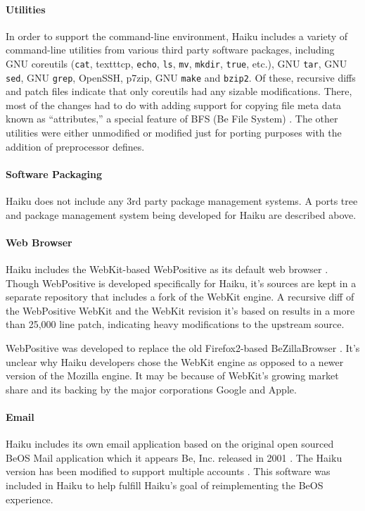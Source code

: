\documentclass{article}
\begin{document}
\paragraph{Utilities}
In order to support the command-line environment, Haiku includes a
variety of command-line utilities from various third party software
packages, including GNU coreutils (\texttt{cat},
texttt{cp}, \texttt{echo}, \texttt{ls}, \texttt{mv}, \texttt{mkdir},
\texttt{true}, etc.), GNU \texttt{tar}, GNU \texttt{sed}, GNU
\texttt{grep}, OpenSSH, p7zip, GNU \texttt{make} and \texttt{bzip2}.
Of these, recursive diffs and patch files \cite{HaikuR1A3Src} indicate
that only coreutils had any sizable modifications.  There, most of the
changes had to do with adding support for copying file meta data known
as ``attributes,'' a special feature of BFS (Be File System)
\cite{BFSWiki}.  The other utilities were either unmodified or
modified just for porting purposes with the addition of preprocessor
defines.

\paragraph{Software Packaging}
Haiku does not include any 3rd party package management systems.  A
ports tree and package management system being developed for Haiku are
described above.

\paragraph{Web Browser}
Haiku includes the WebKit-based WebPositive as its default web browser
\cite{WebPositiveWiki}.  Though WebPositive is developed specifically
for Haiku, it's sources are kept in a separate repository
\cite{WebPositiveTrac} that includes a fork of the WebKit engine.  A
recursive diff of the WebPositive WebKit and the WebKit revision it's
based on results in a more than 25,000 line patch, indicating heavy
modifications to the upstream source.

WebPositive was developed to replace the old Firefox2-based
BeZillaBrowser \cite{WebPositiveWiki}.  It's unclear why Haiku
developers chose the WebKit engine as opposed to a newer version of
the Mozilla engine.  It may be because of WebKit's growing market
share and its backing by the major corporations Google and Apple.

\paragraph{Email}
Haiku includes its own email application based on the original open
sourced BeOS Mail application \cite{BeMailOpenSourced} which it
appears Be, Inc. released in 2001 \cite{BeMailLICENSE}.  The Haiku
version has been modified to support multiple accounts
\cite{BeMailOpenSourced}.  This software was included in Haiku to help
fulfill Haiku's goal of reimplementing the BeOS experience.
\end{document}
